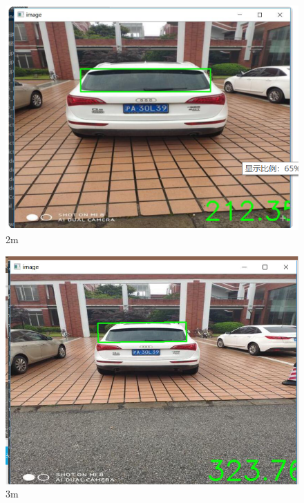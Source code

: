 \documentclass[12pt]{report}
\begin{document}
\begin{figure}[h]
  \centering
  \includegraphics[scale=0.3]{12.png} %
  \caption{2m} %
  \label{Distance} %
\end{figure}

\begin{figure}[h]
  \center
  \includegraphics[scale=0.2]{13.png} %
  \caption{3m} %
  \label{Distance} %
\end{figure}
\end{document}
